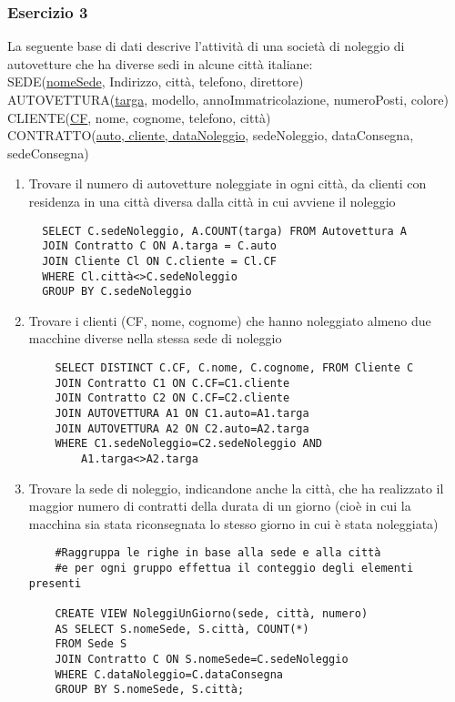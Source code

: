 \documentclass[a4paper]{article}
\begin{document}
\begin{enumerate}
\subsubsection{Esercizio 3}
La seguente base di dati descrive l'attività di una società di noleggio di autovetture che ha diverse sedi in alcune città italiane:\medskip\\
SEDE(\underline{nomeSede}, Indirizzo, città, telefono, direttore)\\
AUTOVETTURA(\underline{targa}, modello, annoImmatricolazione, numeroPosti, colore)\\
CLIENTE(\underline{CF}, nome, cognome, telefono, città)\\
CONTRATTO(\underline{auto, cliente, dataNoleggio}, sedeNoleggio, dataConsegna, sedeConsegna)

\begin{enumerate}
  \item Trovare il numero di autovetture noleggiate in ogni città, da clienti con residenza in una città diversa dalla città in cui avviene il noleggio
  \begin{verbatim}
  SELECT C.sedeNoleggio, A.COUNT(targa) FROM Autovettura A
  JOIN Contratto C ON A.targa = C.auto
  JOIN Cliente Cl ON C.cliente = Cl.CF
  WHERE Cl.città<>C.sedeNoleggio
  GROUP BY C.sedeNoleggio
  \end{verbatim}
  \item Trovare i clienti (CF, nome, cognome) che hanno noleggiato almeno due macchine diverse nella stessa sede di noleggio
  \begin{verbatim}
    SELECT DISTINCT C.CF, C.nome, C.cognome, FROM Cliente C
    JOIN Contratto C1 ON C.CF=C1.cliente
    JOIN Contratto C2 ON C.CF=C2.cliente
    JOIN AUTOVETTURA A1 ON C1.auto=A1.targa
    JOIN AUTOVETTURA A2 ON C2.auto=A2.targa
    WHERE C1.sedeNoleggio=C2.sedeNoleggio AND
        A1.targa<>A2.targa
  \end{verbatim}
  \item Trovare la sede di noleggio, indicandone anche la città, che ha realizzato il maggior numero di contratti della durata di un giorno (cioè in cui la macchina sia stata riconsegnata lo stesso giorno in cui è stata noleggiata)
  \begin{verbatim}
    #Raggruppa le righe in base alla sede e alla città
    #e per ogni gruppo effettua il conteggio degli elementi presenti

    CREATE VIEW NoleggiUnGiorno(sede, città, numero)
    AS SELECT S.nomeSede, S.città, COUNT(*)
    FROM Sede S
    JOIN Contratto C ON S.nomeSede=C.sedeNoleggio
    WHERE C.dataNoleggio=C.dataConsegna
    GROUP BY S.nomeSede, S.città;


\end{verbatim}
\end{enumerate}
\end{enumerate}
\end{document}
